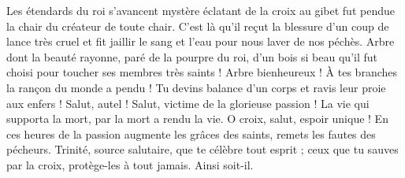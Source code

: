 Les étendards du roi s'avancent
mystère éclatant de la croix
au gibet fut pendue la chair
du créateur de toute chair.
\versseparator
C'est là qu'il reçut la blessure
d'un coup de lance très cruel
et fit jaillir le sang et l'eau
pour nous laver de nos péchès.
\versseparator
Arbre dont la beauté rayonne,
paré de la pourpre du roi,
d'un bois si beau qu'il fut choisi
pour toucher ses membres très saints !
\versseparator
Arbre bienheureux ! À tes branches
la rançon du monde a pendu !
Tu devins balance d'un corps
et ravis leur proie aux enfers !
\versseparator
Salut, autel ! Salut, victime
de la glorieuse passion !
La vie qui supporta la mort,
par la mort a rendu la vie.
\versseparator
O croix, salut, espoir unique !
En ces heures de la passion
augmente les grâces des saints,
remets les fautes des pécheurs.
\versseparator
Trinité, source salutaire,
que te célèbre tout esprit ;
ceux que tu sauves par la croix,
protège-les à tout jamais.
Ainsi soit-il.
